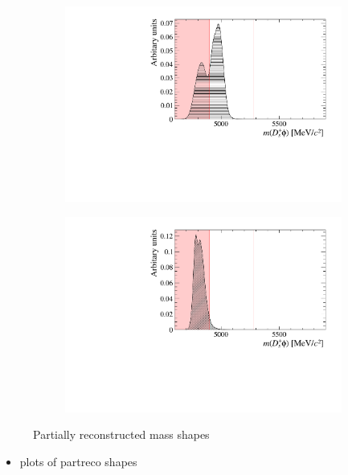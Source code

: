 \begin{figure}[!h]
\begin{subfigure}[t]{0.49\textwidth}
        \includegraphics[width=1.0\textwidth]{figs/B2DsPhi/Bs2DsDs_4600_5900_Shape.pdf}
        \caption{\decay{\Bsb}{\Dsp\Dsm} }
    \end{subfigure}
    \begin{subfigure}[t]{0.49\textwidth}
        \includegraphics[width=1.0\textwidth]{figs/B2DsPhi/Bs2DsstDs_4600_5900_Shape.pdf}
        \caption{\decay{\Bsb}{\Dssp\Dsm} }
    \end{subfigure}
    \caption{Partially reconstructed mass shapes}
    \label{fig:B2DsPhi_signal_fits}   
\end{figure}

{\color{Red}
\begin{itemize}
\item plots of partreco shapes
\end{itemize}
}

